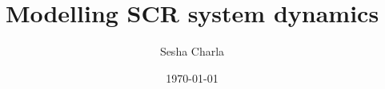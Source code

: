 \documentclass[letterpaper, 11pt]{article}
\title{Modelling SCR system dynamics}
\author{Sesha Charla}
\date{\today}
\begin{document}
\maketitle
\tableofcontents
\newpage

% 
% 
% 
% 
% 
% 
% 
% 
% 
% 
\newpage
\nocite{}


\end{document}
